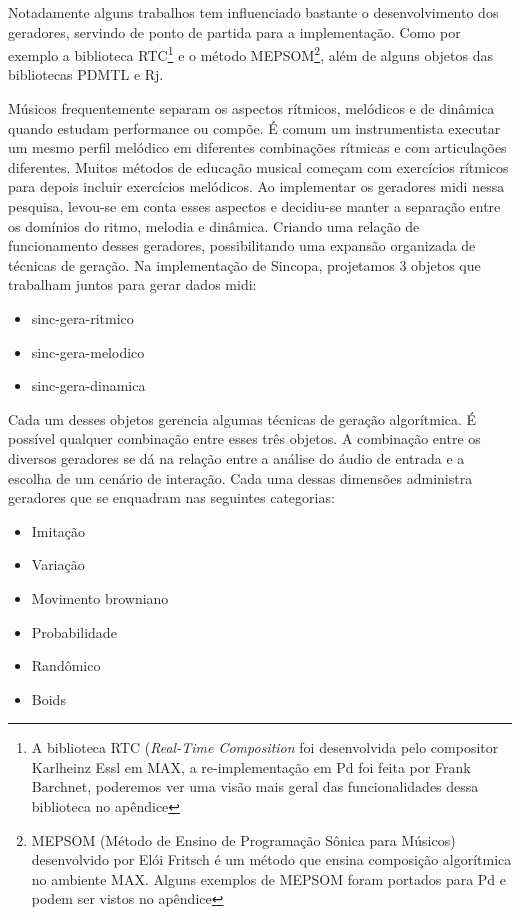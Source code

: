 \documentclass[draft]{ppgmus}
\begin{document}
Notadamente alguns trabalhos tem influenciado bastante o desenvolvimento
dos geradores, servindo de ponto de partida para a implementação. Como
por exemplo a biblioteca RTC\footnote{A biblioteca RTC (\textit{Real-Time Composition} 
foi desenvolvida pelo compositor Karlheinz Essl em MAX, a re-implementação
em Pd foi feita por Frank Barchnet, poderemos ver uma visão mais geral
das funcionalidades dessa biblioteca no apêndice} e o método MEPSOM\footnote{
MEPSOM (Método de Ensino de Programação Sônica para Músicos) desenvolvido por
Elói Fritsch é um método que ensina composição algorítmica no ambiente MAX. Alguns
exemplos de MEPSOM foram portados para Pd e podem ser vistos no apêndice}, além
de alguns objetos das bibliotecas PDMTL e Rj.  


Músicos frequentemente separam os aspectos rítmicos, melódicos e de dinâmica
quando estudam performance ou compõe. É comum um instrumentista executar um 
mesmo perfil melódico em diferentes combinações rítmicas e com articulações
diferentes. Muitos métodos de educação musical começam com exercícios rítmicos
para depois incluir exercícios melódicos. Ao implementar os geradores midi
nessa pesquisa, levou-se em conta esses aspectos e decidiu-se manter a separação
entre os domínios do ritmo, melodia e dinâmica. Criando uma relação de funcionamento
desses geradores, possibilitando uma expansão organizada de técnicas de geração.
Na implementação de Sincopa, projetamos 3 objetos que trabalham juntos para
gerar dados midi: 

\begin{itemize}
 \item   sinc-gera-ritmico
 \item   sinc-gera-melodico
 \item   sinc-gera-dinamica
\end{itemize}

Cada um desses objetos gerencia algumas técnicas de geração
algorítmica. É possível qualquer combinação entre esses três objetos.
A combinação entre os diversos geradores se dá na relação entre a 
análise do áudio de entrada e a escolha de um cenário de interação. 
Cada uma dessas dimensões administra geradores que se enquadram nas seguintes
categorias:

\begin{itemize}
 \item   Imitação
 \item   Variação
 \item   Movimento browniano
 \item   Probabilidade
 \item   Randômico
 \item   Boids
\end{itemize}
\end{document}
